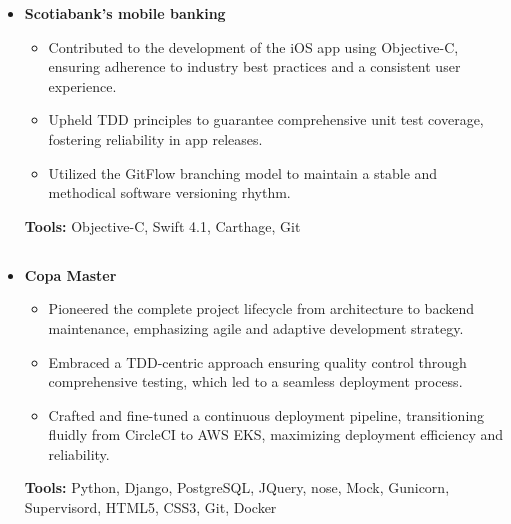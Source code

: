 \documentclass[11pt,a4paper,english]{moderncv}
\begin{document}
{\begin{itemize}
\begin{itemize}
            \item Augmented performance by offloading computationally intensive tasks to Celery jobs, optimizing asynchronous operations.
            \item Engineered an automated content moderation system using AWS Rekognition and Azure Cognitive Services that upheld content quality and compliance.
        \end{itemize}
        \textbf{Tools:} Python, asyncio, Flask, SQLAlchemy, MySQL, MongoDB, Mock, Git, Docker
    \item \textbf{Scotiabank's mobile banking}
        \begin{itemize}
            \item Contributed to the development of the iOS app using Objective-C, ensuring adherence to industry best practices and a consistent user experience.
            \item Upheld TDD principles to guarantee comprehensive unit test coverage, fostering reliability in app releases.
            \item Utilized the GitFlow branching model to maintain a stable and methodical software versioning rhythm.
        \end{itemize}
        \textbf{Tools:} Objective-C, Swift 4.1, Carthage, Git
\end{itemize}
}

\subsection{}

{
\begin{itemize}
    \item \textbf{Copa Master}
        \begin{itemize}
            \item Pioneered the complete project lifecycle from architecture to backend maintenance, emphasizing agile and adaptive development strategy.
            \item Embraced a TDD-centric approach ensuring quality control through comprehensive testing, which led to a seamless deployment process.
            \item Crafted and fine-tuned a continuous deployment pipeline, transitioning fluidly from CircleCI to AWS EKS, maximizing deployment efficiency and reliability.
        \end{itemize}
        \textbf{Tools:} Python, Django, PostgreSQL, JQuery, nose, Mock, Gunicorn, Supervisord, HTML5, CSS3, Git, Docker
\end{itemize}
}
\end{document}
